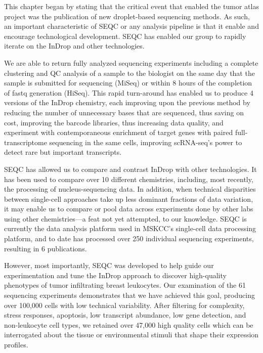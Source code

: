 This chapter began by stating that the critical event that enabled the tumor atlas project was the publication of new droplet-based sequencing methods. 
As such, an important characteristic of SEQC or any analysis pipeline is that it enable and encourage technological development. 
SEQC has enabled our group to rapidly iterate on the InDrop and other technologies. 

We are able to return fully analyzed sequencing experiments including a complete clustering and QC analysis of a sample to the biologist on the same day that the sample is submitted for sequencing (MiSeq) or within 8 hours of the completion of fastq generation (HiSeq). 
This rapid turn-around has enabled us to produce 4 versions of the InDrop chemistry, each improving upon the previous method by reducing the number of unnecessary bases that are sequenced, thus saving on cost, improving the barcode libraries, thus increasing data quality, and experiment with contemporaneous enrichment of target genes with paired full-transcriptome sequencing in the same cells, improving scRNA-seq's power to detect rare but important transcripts. 

SEQC has allowed us to compare and contrast InDrop with other technologies. 
It has been used to compare over 10 different chemistries, including, most recently, the processing of nucleus-sequencing data. 
In addition, when technical disparities between single-cell approaches take up less dominant fractions of data variation, it may enable us to compare or pool data across experiments done by other labs using other chemistries---a feat not yet attempted, to our knowledge.
SEQC is currently the data analysis platform used in MSKCC's single-cell data processing platform, and to date has processed over 250 individual sequencing experiments, resulting in 6 publications. 

However, most importantly, SEQC was developed to help guide our experimentation and tune the InDrop approach to discover high-quality phenotypes of tumor infiltrating breast leukocytes. 
Our examination of the 61 sequencing experiments demonstrates that we have achieved this goal, producing over 100,000 cells with low technical variability.
After filtering for complexity, stress responses, apoptosis, low transcript abundance, low gene detection, and non-leukocyte cell types, we retained over 47,000 high quality cells which can be interrogated about the tissue or environmental stimuli that shape their expression profiles.
